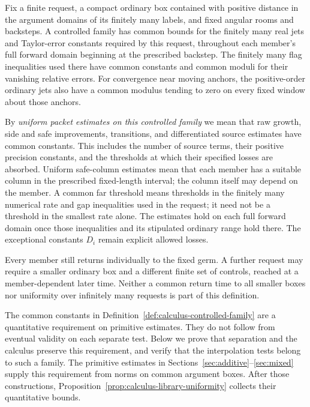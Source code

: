 \begin{definition}
\label{def:calculus-controlled-family}
Fix a finite request, a compact ordinary box contained with positive
distance in the argument domains of its finitely many labels, and fixed
angular rooms and backsteps.  A controlled family has common bounds for
the finitely many real jets and Taylor-error constants required by this
request, throughout each member's full forward domain beginning at the
prescribed backstep.  The finitely many flag inequalities used there have
common constants and common moduli for their vanishing relative errors.
For convergence near moving anchors, the positive-order ordinary jets
also have a common modulus tending to zero on every fixed window about
those anchors.

By \emph{uniform packet estimates on this controlled family} we mean
that raw growth, side and safe improvements, transitions,
and differentiated source estimates have common constants.  This includes
the number of source terms, their positive precision constants, and the
thresholds at which their specified losses are absorbed.  Uniform
safe-column estimates mean that each member has a suitable column
in the prescribed fixed-length interval; the column itself may depend
on the member.  A common far threshold means thresholds in the finitely
many numerical rate and gap
inequalities used in the request; it need not be a threshold in the
smallest rate alone.  The estimates hold on each full forward domain
once those inequalities and its stipulated ordinary range hold there.
The exceptional constants $D_i$ remain explicit allowed losses.

Every member still returns individually to the fixed germ.  A further
request may require a smaller ordinary box and a different finite set of
controls, reached at a member-dependent later time.  Neither a common
return time to all smaller boxes nor uniformity over infinitely many
requests is part of this definition.
\end{definition}

The common constants in Definition~\ref{def:calculus-controlled-family}
are a quantitative requirement on primitive estimates.  They do not
follow from eventual validity on each separate test.  Below we prove that
separation and the calculus preserve this requirement, and verify that
the interpolation tests belong to such a family.  The primitive estimates
in Sections~\ref{sec:additive}--\ref{sec:mixed} supply this requirement
from norms on common argument boxes.  After those constructions,
Proposition~\ref{prop:calculus-library-uniformity} collects their
quantitative bounds.

